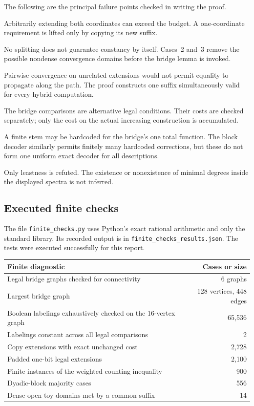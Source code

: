 \documentclass[11pt,a4paper]{article}
\theoremstyle{definition}
\theoremstyle{remark}
\begin{document}
The following are the principal failure points checked in writing the proof.
\begin{description}[style=nextline]
\item[Projection versus independent extension.] Arbitrarily extending both coordinates can exceed the budget. A one-coordinate requirement is lifted only by copying its new suffix.
\item[Density versus no splitting.] No splitting does not guarantee constancy by itself. Cases~2 and~3 remove the possible nondense convergence domains before the bridge lemma is invoked.
\item[One common suffix.] Pairwise convergence on unrelated extensions would not permit equality to propagate along the path. The proof constructs one suffix simultaneously valid for every hybrid computation.
\item[Alternative pairs versus accumulated errors.] The bridge comparisons are alternative legal conditions. Their costs are checked separately; only the cost on the actual increasing construction is accumulated.
\item[Computability versus uniform recovery.] A finite stem may be hardcoded for the bridge's one total function. The block decoder similarly permits finitely many hardcoded corrections, but these do not form one uniform exact decoder for all descriptions.
\item[Least versus minimal.] Only leastness is refuted. The existence or nonexistence of minimal degrees inside the displayed spectra is not inferred.
\end{description}

\subsection{Executed finite checks}
The file \texttt{finite\_checks.py} uses Python's exact rational arithmetic and only the standard library. Its recorded output is in \texttt{finite\_checks\_results.json}. The tests were executed successfully for this report.

\begin{center}
\begin{tabularx}{\textwidth}{@{}Xr@{}}
\toprule
Finite diagnostic & Cases or size \\
\midrule
Legal bridge graphs checked for connectivity & 6 graphs \\
Largest bridge graph & 128 vertices, 448 edges \\
Boolean labelings exhaustively checked on the 16-vertex graph & 65,536 \\
Labelings constant across all legal comparisons & 2 \\
Copy extensions with exact unchanged cost & 2,728 \\
Padded one-bit legal extensions & 2,100 \\
Finite instances of the weighted counting inequality & 900 \\
Dyadic-block majority cases & 556 \\
Dense-open toy domains met by a common suffix & 14 \\
\bottomrule
\end{tabularx}
\end{center}
\end{document}
